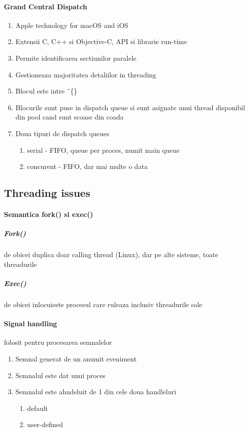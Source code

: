 \documentclass{article}
\begin{document}
\paragraph*{Grand Central Dispatch}
\begin{enumerate}
    \item Apple technology for macOS and iOS
    \item Extensii C, C++ si Objective-C, API si librarie run-time
    \item Permite identificarea sectiunilor paralele
    \item Gestioneaza majoritatea detaliilor in threading
    \item Blocul este intre \^\ \{\}
    \item Blocurile sunt puse in dispatch queue si sunt asignate unui thread disponibil din pool cand sunt scoase din coada
    \item Doua tipuri de dispatch queues
    \begin{enumerate}
        \item serial - FIFO, queue per proces, numit main queue
        \item concurent - FIFO, dar mai multe o data
    \end{enumerate}
\end{enumerate}

\subsection*{Threading issues}
\paragraph*{Semantica fork() si exec()}
\subparagraph*{Fork()} de obicei duplica doar calling thread (Linux), dar pe alte sisteme, toate threadurile
\subparagraph*{Exec()} de obicei inlocuieste procesul care ruleaza inclusiv threadurile sale

\paragraph*{Signal handling} folosit pentru procesarea semnalelor
\begin{enumerate}
    \item Semnal generat de un anumit eveniment
    \item Semnalul este dat unui proces
    \item Semnalul este ahndeluit de 1 din cele doua handleluri
    \begin{enumerate}
        \item default
        \item user-defined
    \end{enumerate}
\end{enumerate}
\end{document}
